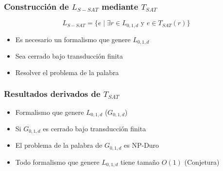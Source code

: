 \documentclass{beamer}
\begin{document}
\begin{frame}
    \frametitle{Construcción de $L_{S-SAT}$ mediante $T_{SAT}$}
    
    $$L_{S-SAT}=\{e\mid \exists r\in L_{0,1,d} \text{ y } e\in T_{SAT}(r)\}$$
    \pause
    \vspace{1cm}
    
    \begin{itemize}
        \item Es necesario un formalismo que genere $L_{0,1,d}$
              \pause
        \item Sea cerrado bajo transducción finita
              \pause
        \item Resolver el problema de la palabra
    \end{itemize}
\end{frame}

\begin{frame}
    \frametitle{Resultados derivados de $T_{SAT}$}
    
    \begin{itemize}
        \item Formalismo que genere $L_{0,1,d}$ ($G_{0,1,d}$)
              \pause
        \item Si $G_{0,1,d}$ es cerrado bajo transducción finita
              \pause
        \item El problema de la palabra de $G_{0,1,d}$ es NP-Duro
              \pause
        \item Todo formalismo que genere $L_{0,1,d}$ tiene tamaño $O(1)$ (Conjetura)
    \end{itemize}
\end{frame}
\end{document}
